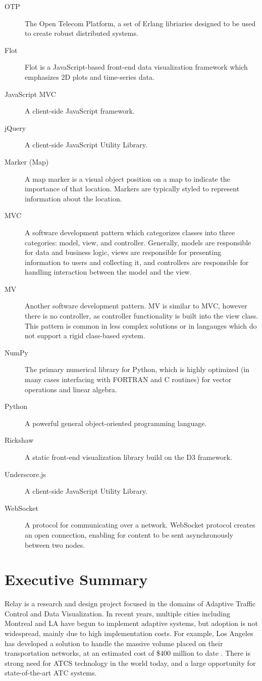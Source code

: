 \documentclass{report}
\begin{document}
\begin{description}
\item[OTP] The Open Telecom Platform, a set of Erlang libriaries designed to be used to create robust distributed systems.
\item[Flot] Flot is a JavaScript-based front-end data visualization framework which emphasizes 2D plots and time-series data.
\item[JavaScript MVC] A client-side JavaScript framework.
\item[jQuery] A client-side JavaScript Utility Library.
\item[Marker (Map)] A map marker is a visual object position on a map to indicate the importance of that location. Markers are typically styled to represent information about the location.
\item[MVC] A software development pattern which categorizes classes into three categories: model, view, and controller. Generally, models are responsible for data and business logic, views are responsible for presenting information to users and collecting it, and controllers are responsible for handling interaction between the model and the view.
\item[MV] Another software development pattern. MV is similar to MVC, however there is no controller, as controller functionality is built into the view class. This pattern is common in less complex solutions or in langauges which do not support a rigid class-based system.
\item[NumPy] The primary numerical library for Python, which is highly optimized (in many cases interfacing with FORTRAN and C routines) for vector operations and linear algebra.
\item[Python] A powerful general object-oriented programming language.
\item[Rickshaw] A static front-end visualization library build on the D3 framework.
\item[Underscore.js] A client-side JavaScript Utility Library.
\item[WebSocket] A protocol for communicating over a network. WebSocket protocol creates an open connection, enabling for content to be sent asynchronously between two nodes.
\end{description}


\newpage
\doublespacing
{}

\chapter*{Executive Summary}
Relay is a research and design project focused in the domains of Adaptive Traffic Control and Data Visualization.
In recent years, multiple cities including Montreal and LA have begun to implement adaptive systems, but adoption is not widespread, mainly due to high implementation costs.
For example, Los Angeles has developed a solution to handle the massive volume placed on their transportation networks, at an estimated cost of \$400 million to date \cite{la-atcs-article}.
There is strong need for ATCS technology in the world today, and a large opportunity for state-of-the-art ATC systems.
\end{document}
